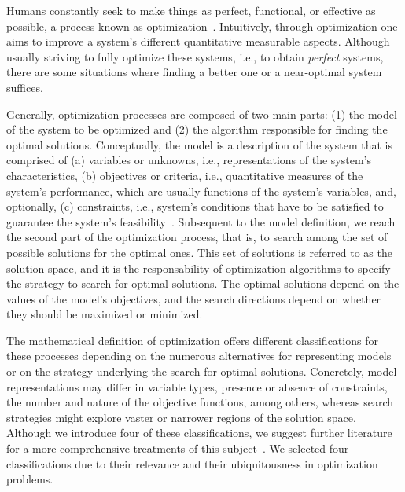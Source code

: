 \cleardoublepage
\label{chap:intro}
	
	Humans constantly seek to make things as perfect, functional, or effective as possible, a process known as optimization~\cite{MerriamWebster2017OptimizationDefinition}. Intuitively, through optimization one aims to improve a system's different quantitative measurable aspects. Although usually striving to fully optimize these systems, i.e., to obtain \textit{perfect} systems, there are some situations where finding a better one or a near-optimal system suffices.

	Generally, optimization processes are composed of two main parts: (1) the model of the system to be optimized and (2) the algorithm responsible for finding the optimal solutions. Conceptually, the model is a description of the system that is comprised of (a) variables or unknowns, i.e., representations of the system's characteristics, (b) objectives or criteria, i.e., quantitative measures of the system's performance, which are usually functions of the system's variables, and, optionally, (c) constraints, i.e., system's conditions that have to be satisfied to guarantee the system's feasibility~\cite{Nocedal2011NumericalOptimization}. Subsequent to the model definition, we reach the second part of the optimization process, that is, to search among the set of possible solutions for the optimal ones. This set of solutions is referred to as the solution space, and it is the responsability of optimization algorithms to specify the strategy to search for optimal solutions. The optimal solutions depend on the values of the model's objectives, and the search directions depend on whether they should be maximized or minimized. 
	
	The mathematical definition of optimization offers different classifications for these processes depending on the numerous alternatives for representing models or on the strategy underlying the search for optimal solutions. Concretely, model representations may differ in variable types, presence or absence of constraints, the number and nature of the objective functions, among others, whereas search strategies might explore vaster or narrower regions of the solution space. Although we introduce four of these classifications, we suggest further literature for a more comprehensive treatments of this subject~\cite{Nocedal2011NumericalOptimization,Nemhauser1988}. We selected four classifications due to their relevance and their ubiquitousness in optimization problems.
	
